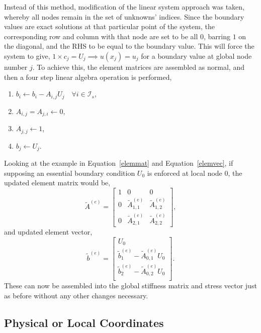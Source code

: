 Instead of this method, modification of the linear system approach was taken, whereby all nodes remain in the set of unknowns' indices. Since the boundary values are exact solutions at that particular point of the system, the corresponding row and column with that node are set to be all $0$, barring $1$ on the diagonal, and the RHS to be equal to the boundary value. This will force the system to give, $1 \times c_j = U_j \implies u(x_j) = u_j$ for a boundary value at global node number $j$. To achieve this, the element matrices are assembled as normal, and then a four step linear algebra operation is performed,
\begin{enumerate}
	\item $b_i \leftarrow b_i - A_{i,j}U_j\quad\forall i \in \mathcal{I}_s,$
	\item $A_{i,j} = A_{j,i} \leftarrow 0$,
	\item $A_{j,j} \leftarrow 1$,
	\item $b_j \leftarrow U_j$.
\end{enumerate}
Looking at the example in Equation~\ref{elemmat} and Equation~\ref{elemvec}, if supposing an essential boundary condition $U_0$ is enforced at local node $0$, the updated element matrix would be,
\begin{equation}
	\widetilde{A}^{(e)} =
	\left[\begin{matrix} 
		1 & 0 & 0 \\
		0 & \widetilde{A}^{(e)}_{1,1} & \widetilde{A}^{(e)}_{1,2} \\
		0 & \widetilde{A}^{(e)}_{2,1} & \widetilde{A}^{(e)}_{2,2}
	\end{matrix}\right],
\end{equation}
and updated element vector,
\begin{equation}
	\widetilde{b}^{(e)} =
	\left[\begin{matrix}
		U_0 \\
		\widetilde{b}^{(e)}_1 - \widetilde{A}^{(e)}_{0,1} U_0 \\
		\widetilde{b}^{(e)}_2 -\widetilde{A}^{(e)}_{0,2} U_0 \\
	\end{matrix}\right].
\end{equation}
These can now be assembled into the global stiffness matrix and stress vector just as before without any other changes necessary.

\subsection{Physical or Local Coordinates}\label{coords}

